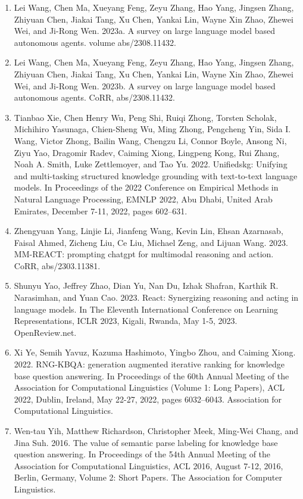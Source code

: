 \documentclass[11pt,UTF8,fontset=fandol]{ctexart}
\begin{document}
\begin{enumerate}[leftmargin=2em]
\item Lei Wang, Chen Ma, Xueyang Feng, Zeyu Zhang, Hao Yang, Jingsen Zhang, Zhiyuan Chen, Jiakai Tang, Xu Chen, Yankai Lin, Wayne Xin Zhao, Zhewei Wei, and Ji-Rong Wen. 2023a. A survey on large language model based autonomous agents. volume abs/2308.11432.
\item Lei Wang, Chen Ma, Xueyang Feng, Zeyu Zhang, Hao Yang, Jingsen Zhang, Zhiyuan Chen, Jiakai Tang, Xu Chen, Yankai Lin, Wayne Xin Zhao, Zhewei Wei, and Ji-Rong Wen. 2023b. A survey on large language model based autonomous agents. CoRR, abs/2308.11432.
\item Tianbao Xie, Chen Henry Wu, Peng Shi, Ruiqi Zhong, Torsten Scholak, Michihiro Yasunaga, Chien-Sheng Wu, Ming Zhong, Pengcheng Yin, Sida I. Wang, Victor Zhong, Bailin Wang, Chengzu Li, Connor Boyle, Ansong Ni, Ziyu Yao, Dragomir Radev, Caiming Xiong, Lingpeng Kong, Rui Zhang, Noah A. Smith, Luke Zettlemoyer, and Tao Yu. 2022. Unifiedskg: Unifying and multi-tasking structured knowledge grounding with text-to-text language models. In Proceedings of the 2022 Conference on Empirical Methods in Natural Language Processing, EMNLP 2022, Abu Dhabi, United Arab Emirates, December 7-11, 2022, pages 602--631.
\item Zhengyuan Yang, Linjie Li, Jianfeng Wang, Kevin Lin, Ehsan Azarnasab, Faisal Ahmed, Zicheng Liu, Ce Liu, Michael Zeng, and Lijuan Wang. 2023. MM-REACT: prompting chatgpt for multimodal reasoning and action. CoRR, abs/2303.11381.
\item Shunyu Yao, Jeffrey Zhao, Dian Yu, Nan Du, Izhak Shafran, Karthik R. Narasimhan, and Yuan Cao. 2023. React: Synergizing reasoning and acting in language models. In The Eleventh International Conference on Learning Representations, ICLR 2023, Kigali, Rwanda, May 1-5, 2023. OpenReview.net.
\item Xi Ye, Semih Yavuz, Kazuma Hashimoto, Yingbo Zhou, and Caiming Xiong. 2022. RNG-KBQA: generation augmented iterative ranking for knowledge base question answering. In Proceedings of the 60th Annual Meeting of the Association for Computational Linguistics (Volume 1: Long Papers), ACL 2022, Dublin, Ireland, May 22-27, 2022, pages 6032--6043. Association for Computational Linguistics.
\item Wen-tau Yih, Matthew Richardson, Christopher Meek, Ming-Wei Chang, and Jina Suh. 2016. The value of semantic parse labeling for knowledge base question answering. In Proceedings of the 54th Annual Meeting of the Association for Computational Linguistics, ACL 2016, August 7-12, 2016, Berlin, Germany, Volume 2: Short Papers. The Association for Computer Linguistics.

\end{enumerate}
\end{document}
